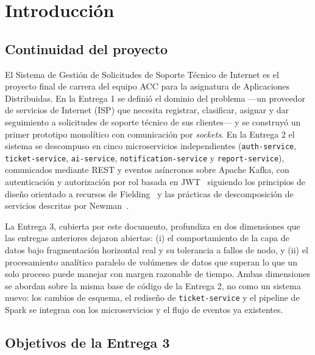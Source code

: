 \section{Introducción}
\label{sec:introduccion}

\subsection{Continuidad del proyecto}

El Sistema de Gestión de Solicitudes de Soporte Técnico de Internet es el proyecto final de
carrera del equipo ACC para la asignatura de Aplicaciones Distribuidas. En la Entrega 1 se
definió el dominio del problema —un proveedor de servicios de Internet (ISP) que necesita
registrar, clasificar, asignar y dar seguimiento a solicitudes de soporte técnico de sus
clientes— y se construyó un primer prototipo monolítico con comunicación por \emph{sockets}. En
la Entrega 2 el sistema se descompuso en cinco microservicios independientes
(\texttt{auth-service}, \texttt{ticket-service}, \texttt{ai-service}, \texttt{notification-service}
y \texttt{report-service}), comunicados mediante REST y eventos asíncronos sobre Apache Kafka, con
autenticación y autorización por rol basada en JWT~\cite{jones2015jwt} siguiendo los principios de
diseño orientado a recursos de Fielding~\cite{fielding2000rest} y las prácticas de descomposición
de servicios descritas por Newman~\cite{newman2021microservices}.

La Entrega 3, cubierta por este documento, profundiza en dos dimensiones que las entregas
anteriores dejaron abiertas: (i) el comportamiento de la capa de datos bajo fragmentación
horizontal real y su tolerancia a fallos de nodo, y (ii) el procesamiento analítico paralelo de
volúmenes de datos que superan lo que un solo proceso puede manejar con margen razonable de
tiempo. Ambas dimensiones se abordan sobre la misma base de código de la Entrega 2, no como un
sistema nuevo: los cambios de esquema, el rediseño de \texttt{ticket-service} y el pipeline de
Spark se integran con los microservicios y el flujo de eventos ya existentes.

\subsection{Objetivos de la Entrega 3}

